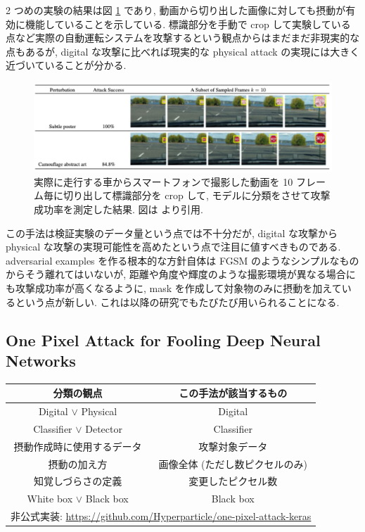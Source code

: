 2 つめの実験の結果は図 \ref{fig:robust-physical-result-video} であり, 動画から切り出した画像に対しても摂動が有効に機能していることを示している.
標識部分を手動で crop して実験している点など実際の自動運転システムを攻撃するという観点からはまだまだ非現実的な点もあるが, digital な攻撃に比べれば現実的な physical attack の実現には大きく近づいていることが分かる.
%
\begin{figure}[htbp]
\begin{center}
\includegraphics[width=15.0cm]{figures/robust-physical-result-video.pdf}
\end{center}
\caption{
実際に走行する車からスマートフォンで撮影した動画を 10 フレーム毎に切り出して標識部分を crop して, モデルに分類をさせて攻撃成功率を測定した結果.
図は \cite{eykholt2018robust} より引用.
}
\label{fig:robust-physical-result-video}
\end{figure}
%

この手法は検証実験のデータ量という点では不十分だが, digital な攻撃から physical な攻撃の実現可能性を高めたという点で注目に値すべきものである.
adversarial examples を作る根本的な方針自体は FGSM のようなシンプルなものからそう離れてはいないが, 距離や角度や輝度のような撮影環境が異なる場合にも攻撃成功率が高くなるように,  mask を作成して対象物のみに摂動を加えているという点が新しい.
これは以降の研究でもたびたび用いられることになる.



\subsection{One Pixel Attack for Fooling Deep Neural Networks}
\label{subsec:one-pixel}
%
\begin{table}[htbp]
\begin{center}
\begin{tabular}{|c|c|}
\hline
分類の観点 & この手法が該当するもの \\
\hline
Digital $\lor$ Physical & Digital \\
Classifier $\lor$ Detector & Classifier \\
摂動作成時に使用するデータ & 攻撃対象データ \\
摂動の加え方 & 画像全体 (ただし数ピクセルのみ) \\
知覚しづらさの定義 & 変更したピクセル数 \\
White box $\lor$ Black box & Black box \\
\hline
\multicolumn{2}{|c|}{非公式実装: \href{https://github.com/Hyperparticle/one-pixel-attack-keras}{https://github.com/Hyperparticle/one-pixel-attack-keras}} \\
\hline
\end{tabular}
\label{tb:one-pixel-summary}
\end{center}
\end{table}
%

